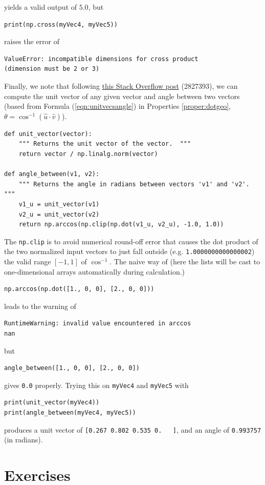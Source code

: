 yields a valid output of $5.0$, but
\begin{lstlisting}
print(np.cross(myVec4, myVec5))
\end{lstlisting}
raises the error of
\begin{lstlisting}
ValueError: incompatible dimensions for cross product
(dimension must be 2 or 3)    
\end{lstlisting}
Finally, we note that following \href{https://stackoverflow.com/questions/2827393/angles-between-two-n-dimensional-vectors-in-python}{this Stack Overflow post} (2827393), we can compute the unit vector of any given vector and angle between two vectors (based from Formula (\ref{eqn:unitvecsangle}) in Properties \ref{proper:dotgeo}, $\theta = \cos^{-1}(\hat{u} \cdot \hat{v})$).
\begin{lstlisting}
def unit_vector(vector):
    """ Returns the unit vector of the vector.  """
    return vector / np.linalg.norm(vector)

def angle_between(v1, v2):
    """ Returns the angle in radians between vectors 'v1' and 'v2'. """
    v1_u = unit_vector(v1)
    v2_u = unit_vector(v2)
    return np.arccos(np.clip(np.dot(v1_u, v2_u), -1.0, 1.0))    
\end{lstlisting}
The \verb|np.clip| is to avoid numerical round-off error that causes the dot product of the two normalized input vectors to just fall outside (e.g. \verb|1.0000000000000002|) the valid range $[-1, 1]$ of $\cos^{-1}$. The naive way of (here the lists will be cast to one-dimensional arrays automatically during calculation.) 
\begin{lstlisting}
np.arccos(np.dot([1., 0, 0], [2., 0, 0]))
\end{lstlisting}
leads to the warning of
\begin{lstlisting}
RuntimeWarning: invalid value encountered in arccos  
nan
\end{lstlisting}
but
\begin{lstlisting}
angle_between([1., 0, 0], [2., 0, 0])
\end{lstlisting}
gives \verb|0.0| properly. Trying this on \verb|myVec4| and \verb|myVec5| with
\begin{lstlisting}
print(unit_vector(myVec4))
print(angle_between(myVec4, myVec5))
\end{lstlisting}
produces a unit vector of \verb|[0.267 0.802 0.535 0.   ]|, and an angle of \verb|0.993757| (in radians).

\section{Exercises}

